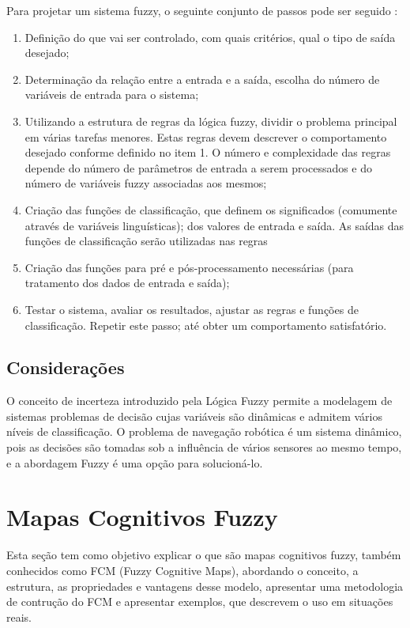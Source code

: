 Para projetar um sistema fuzzy, o seguinte conjunto de passos pode ser seguido \cite{FUZZYLOGICTUTORIAL}:

\begin{enumerate}
    \item Definição do que vai ser controlado, com quais critérios, qual o tipo de saída desejado;
    \item Determinação da relação entre a entrada e a saída, escolha do número de variáveis de entrada para o sistema;
    \item Utilizando a estrutura de regras da lógica fuzzy, dividir o problema principal em várias tarefas menores. Estas
    regras devem descrever o comportamento desejado conforme definido no item 1. O número e complexidade das regras depende do número de parâmetros de entrada a serem processados e do número de variáveis fuzzy associadas aos mesmos;
    \item Criação das funções de classificação, que definem os significados (comumente através de variáveis linguísticas);
    dos valores de entrada e saída. As saídas das funções de classificação serão utilizadas nas regras
    \item Criação das funções para pré e pós-processamento necessárias (para tratamento dos dados de entrada e saída);
    \item Testar o sistema, avaliar os resultados, ajustar as regras e funções de classificação. Repetir este passo;
    até obter um comportamento satisfatório.
\end{enumerate}

\subsection{Considerações}

O conceito de incerteza introduzido pela Lógica Fuzzy permite a modelagem de sistemas problemas de decisão cujas variáveis são dinâmicas e admitem vários níveis de classificação. O problema de navegação robótica
é um sistema dinâmico, pois as decisões são tomadas sob a influência de vários sensores ao mesmo tempo, e a abordagem Fuzzy é uma opção para solucioná-lo.

\section{Mapas Cognitivos Fuzzy}

Esta seção tem como objetivo explicar o que são mapas cognitivos fuzzy, também conhecidos como FCM (Fuzzy Cognitive Maps), abordando o conceito, a estrutura, as propriedades e vantagens desse modelo, apresentar uma metodologia de contrução do FCM e apresentar exemplos, que descrevem o uso em situações reais.

